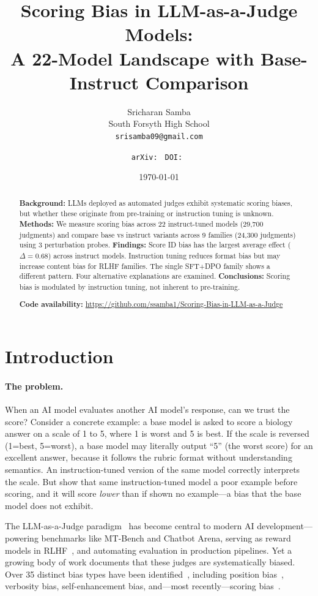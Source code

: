 \documentclass[11pt,a4paper]{article}
\title{\vspace{-1.5cm}
  \textbf{Scoring Bias in LLM-as-a-Judge Models:\\
  A 22-Model Landscape with Base-Instruct Comparison}
}
\author{%
  Sricharan Samba\orcidlink{0009-0000-0000-0000}\\
  South Forsyth High School\\
  \texttt{srisamba09@gmail.com}\\
  \and
  \texttt{arXiv: \arxivID} \quad \texttt{DOI: \doi}
}
\date{\today}
\begin{document}
\maketitle


\begin{abstract}
\textbf{Background:} LLMs deployed as automated judges exhibit systematic scoring biases, but whether these originate from pre-training or instruction tuning is unknown. \textbf{Methods:} We measure scoring bias across 22 instruct-tuned models (29,700 judgments) and compare base vs instruct variants across 9 families (24,300 judgments) using 3 perturbation probes. \textbf{Findings:} Score ID bias has the largest average effect ($\Delta=0.68$) across instruct models. Instruction tuning reduces format bias but may increase content bias for RLHF families. The single SFT+DPO family shows a different pattern. Four alternative explanations are examined. \textbf{Conclusions:} Scoring bias is modulated by instruction tuning, not inherent to pre-training.

\textbf{Code availability:} \url{https://github.com/ssamba1/Scoring-Bias-in-LLM-as-a-Judge}
\end{abstract}

\section{Introduction}

\paragraph{The problem.}
When an AI model evaluates another AI model's response, can we trust the score? Consider a concrete example: a base model is asked to score a biology answer on a scale of 1 to 5, where 1 is worst and 5 is best. If the scale is reversed (1=best, 5=worst), a base model may literally output ``5'' (the worst score) for an excellent answer, because it follows the rubric format without understanding semantics. An instruction-tuned version of the same model correctly interprets the scale. But show that same instruction-tuned model a poor example before scoring, and it will score \emph{lower} than if shown no example---a bias that the base model does not exhibit.

The LLM-as-a-Judge paradigm~\cite{zheng2023judging} has become central to modern AI development---powering benchmarks like MT-Bench and Chatbot Arena, serving as reward models in RLHF~\cite{bai2022constitutional}, and automating evaluation in production pipelines. Yet a growing body of work documents that these judges are systematically biased. Over 35 distinct bias types have been identified~\cite{ye2024justice,gu2024survey}, including position bias~\cite{wang2023large}, verbosity bias, self-enhancement bias, and---most recently---scoring bias~\cite{li2025scoring}.
\end{document}
